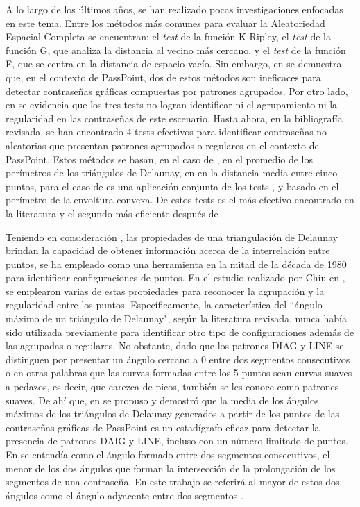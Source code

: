 \documentclass[12pt]{report}
\begin{document}
	A lo largo de los últimos años, se han realizado pocas investigaciones enfocadas en este tema. Entre los métodos más comunes para evaluar la Aleatoriedad Espacial Completa se encuentran: el \textit{test} de la función K-Ripley, el \textit{test} de la función G, que analiza la distancia al vecino más cercano, y el \textit{test} de la función F, que se centra en la distancia de espacio vacío. Sin embargo, en \cite{6,7} se demuestra que, en el contexto de PassPoint, dos de estos métodos son ineficaces para detectar contraseñas gráficas compuestas por patrones agrupados. Por otro lado, en \cite{7,8} se evidencia que los tres tests no logran identificar ni el agrupamiento ni la regularidad en las contraseñas de este escenario. Hasta ahora, en la bibliografía revisada, se han encontrado 4 tests efectivos \cite{7,9,10,11} para identificar contraseñas no aleatorias que presentan patrones agrupados o regulares en el contexto de PassPoint. Estos métodos se basan, en el caso de \cite{9}, en el promedio de los perímetros de los triángulos de Delaunay, en  \cite{7} en la distancia media entre cinco puntos, para el caso de \cite{10} es una aplicación conjunta de los tests \cite{7,9}, y \cite{11} basado en  el perímetro de la envoltura convexa. De estos tests \cite{11} es el más efectivo encontrado en la literatura y el segundo más eficiente después de \cite{7}.
	
	Teniendo en consideración \cite{12}, las propiedades de una triangulación de Delaunay brindan la capacidad de obtener información acerca de la interrelación entre puntos, se ha empleado como una herramienta en la mitad de la década de 1980 para identificar configuraciones de puntos. En el estudio realizado por Chiu en \cite{12}, se emplearon varias de estas propiedades para reconocer la agrupación y la regularidad entre los puntos. Específicamente, la característica del ``ángulo máximo de un triángulo de Delaunay", según la literatura revisada, nunca había sido utilizada previamente para identificar otro tipo de configuraciones además de las agrupadas o regulares. No obstante, dado que los patrones DIAG y LINE se distinguen por presentar un ángulo cercano a 0{\degree } entre dos segmentos consecutivos o en otras palabras que las curvas formadas entre los 5 puntos sean curvas suaves a pedazos, es decir, que carezca de picos, también se les conoce como patrones suaves.  De ahí que, en \cite{13} se propuso y demostró que la media de los ángulos máximos de los triángulos de Delaunay generados a partir de los puntos de las contraseñas gráficas de PassPoint es un estadígrafo eficaz para detectar la presencia de patrones DAIG y LINE, incluso con un número limitado de puntos. En \cite{5} se entendía como el ángulo formado entre dos segmentos consecutivos, el menor de los dos ángulos que forman la intersección de la prolongación de los segmentos de una contraseña. En este trabajo se referirá al mayor de estos dos ángulos como el ángulo adyacente entre dos segmentos .
\end{document}
